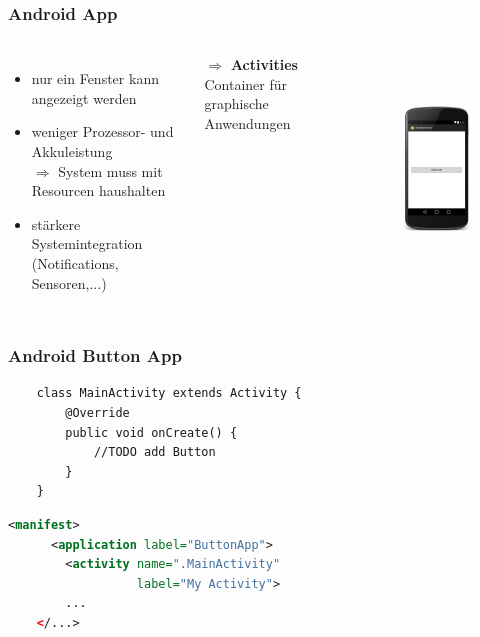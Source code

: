 \begin{frame}[c]
	\frametitle{Android App}
	\begin{columns}[t]
	\begin{itemize}
	\item nur ein Fenster kann angezeigt werden \pause
	\item weniger Prozessor- und Akkuleistung \pause \\
		$\Rightarrow$ System muss mit Resourcen haushalten \pause
	\item stärkere Systemintegration \\ (Notifications, Sensoren,...) \pause
	\end{itemize}
	\vspace{0.2cm}
	$\Rightarrow$ \textbf{Activities} \\
	\hspace{1cm}Container für graphische Anwendungen \pause

	\vspace{-1cm}
	\begin{figure}
	\includegraphics[height=6cm]{pictures/button-android-framed.png}
	\end{figure}
	\end{columns}
\end{frame}

\begin{frame}[c,fragile]
	\frametitle{Android Button App}
	\begin{lstlisting}
	class MainActivity extends Activity {
	    @Override
	    public void onCreate() {
	        //TODO add Button
	    }
	}
	\end{lstlisting}
	\pause \vspace{0.5cm}
	\begin{lstlisting}[language=XML]
	<manifest>
	  <application label="ButtonApp">
	    <activity name=".MainActivity" 
	              label="My Activity">
        ...
	</...>
	\end{lstlisting}
\end{frame}

